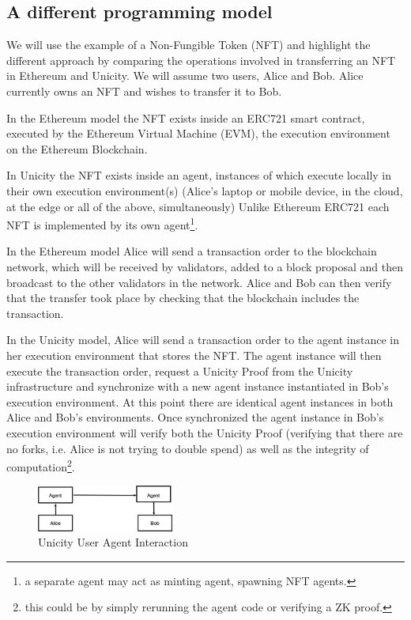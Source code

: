 \documentclass{article}
\begin{document}
\subsection{A different programming model}

We will use the example of a Non-Fungible Token (NFT) and highlight the different approach by comparing the operations involved in transferring an NFT in Ethereum and Unicity.  We will assume two users, Alice and Bob. Alice currently owns an NFT and wishes to transfer it to Bob.

In the Ethereum model the NFT exists inside an ERC721 smart contract, executed by the Ethereum Virtual Machine (EVM), the execution environment on the Ethereum Blockchain.



In Unicity the NFT exists inside an agent, instances of which execute locally in their own execution environment(s) (Alice's laptop or mobile device, in the cloud, at the edge or all of the above, simultaneously) Unlike Ethereum ERC721 each NFT is implemented by its own agent\footnote{a separate agent may act as minting agent, spawning NFT agents.}.


In the Ethereum model Alice will send a transaction order to the blockchain network, which will be received by validators, added to a block proposal and then broadcast to the other validators in the network. Alice and Bob can then verify that the transfer took place by checking that the blockchain includes the transaction.


In the Unicity model, Alice will send a transaction order to the agent instance in her execution environment that stores the NFT. The agent instance will then execute the transaction order, request a Unicity Proof from the Unicity infrastructure and synchronize with a new agent instance instantiated in Bob's execution environment. At this point there are identical agent instances in both Alice and Bob's environments. Once synchronized the agent instance in Bob's execution environment will verify both the Unicity Proof (verifying that there are no forks, i.e. Alice is not trying to double spend) as well as the integrity of computation\footnote{this could be by simply rerunning the agent code or verifying a ZK proof.}.

\begin{figure}[htbp]
    \centering
    \includegraphics[width=0.4\textwidth]{UserAgent.png}
    \caption{Unicity User Agent Interaction}
    \label{fig:UserAgent}
\end{figure}
\end{document}
